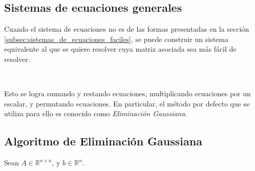 
\subsection{Sistemas de ecuaciones generales}\label{subsec:sistemas_de_ecuaciones_generales}

Cuando el sistema de ecuaciones no es de las formas presentadas en la sección \ref{subsec:sistemas_de_ecuaciones_faciles}, se puede construir un sistema equivalente al que se quiere resolver cuya matriz asociada sea más fácil de resolver.

\

Esto se logra sumando y restando ecuaciones, multiplicando ecuaciones por un escalar, y permutando ecuaciones. En particular, el método por defecto que se utiliza para ello es conocido como \emph{Eliminación Gaussiana}.

\subsection{Algoritmo de Eliminación Gaussiana}\label{subsec:algotimo_de_eliminacion_gaussiana}

Sean $A \in \mathbb{R}^{n \times n}$, y $b \in \mathbb{R}^n$.

